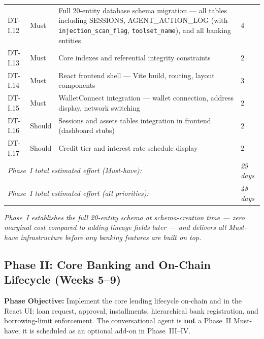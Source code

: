 \documentclass[12pt,a4paper]{report}
\begin{document}
\begin{table}[H]
\begin{tabular}{p{1.8cm}p{1.8cm}p{7.5cm}p{1.5cm}}
DT-I.12 & Must & Full 20-entity database schema migration --- all tables including SESSIONS, AGENT\_ACTION\_LOG (with \texttt{injection\_scan\_flag}, \texttt{toolset\_name}), and all banking entities & 4 \\
DT-I.13 & Must & Core indexes and referential integrity constraints & 2 \\
DT-I.14 & Must & React frontend shell --- Vite build, routing, layout components & 3 \\
DT-I.15 & Must & WalletConnect integration --- wallet connection, address display, network switching & 2 \\
DT-I.16 & Should & Sessions and assets tables integration in frontend (dashboard stubs) & 2 \\
DT-I.17 & Should & Credit tier and interest rate schedule display & 2 \\
\multicolumn{3}{l}{\textit{Phase~I total estimated effort (Must-have):}} & \textit{29 days} \\
\multicolumn{3}{l}{\textit{Phase~I total estimated effort (all priorities):}} & \textit{48 days} \\
\bottomrule
\end{tabular}
\end{table}


\vspace{2pt}
\noindent\textit{\small Phase~I establishes the full 20-entity schema at schema-creation time --- zero marginal cost compared to adding lineage fields later --- and delivers all Must-have infrastructure before any banking features are built on top.}

\subsection{Phase II: Core Banking and On-Chain Lifecycle (Weeks 5--9)}

\textbf{Phase Objective:} Implement the core lending lifecycle on-chain and in the React UI: loan request, approval, installments, hierarchical bank registration, and borrowing-limit enforcement. The conversational agent is \textbf{not} a Phase~II Must-have; it is scheduled as an optional add-on in Phase~III--IV.
\end{document}

